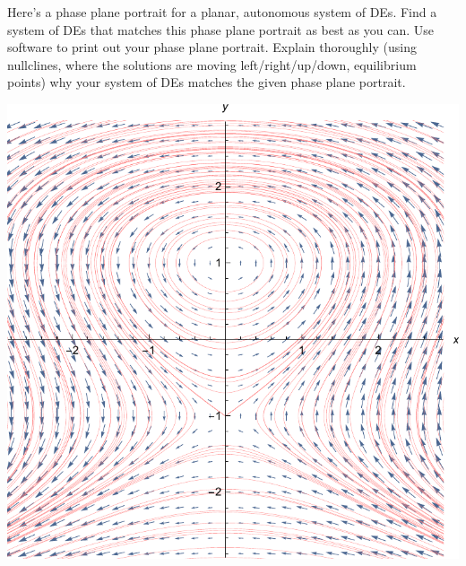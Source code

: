 \documentclass[12pt,letterpaper]{hmcpset}
\begin{document}
\begin{problem}[2]
    Here's a phase plane portrait for a planar, autonomous system of
    DEs. Find a system of DEs that matches this phase plane portrait
    as best as you can. Use software to print out your phase plane
    portrait. Explain thoroughly (using nullclines, where the
    solutions are moving left/right/up/down, equilibrium points) why
    your system of DEs matches the given phase plane portrait.
    \begin{center}
        \includegraphics[scale=0.8]{img/june_1_2}
    \end{center}
\end{problem}
\begin{solution}
    \vfill
\end{solution}
\newpage
\end{document}
